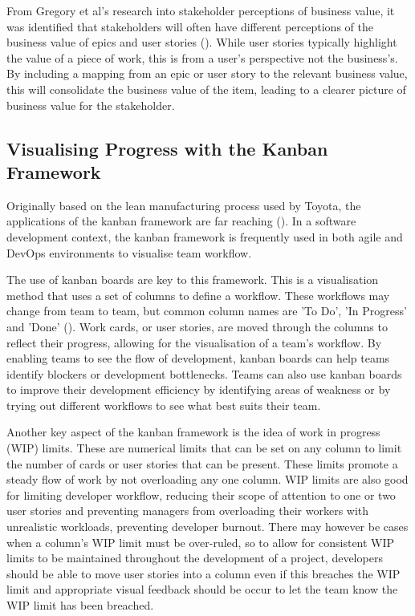\documentclass[l4proj.tex]{subfiles}
\begin{document}
From Gregory et al's research into stakeholder perceptions of business value, it was identified that stakeholders will often have different perceptions of the business value of epics and user stories (\cite{Gregory2020}). While user stories typically highlight the value of a piece of work, this is from a user's perspective not the business's. By including a mapping from an epic or user story to the relevant business value, this will consolidate the business value of the item, leading to a clearer picture of business value for the stakeholder.

\subsection{Visualising Progress with the Kanban Framework}
Originally based on the lean manufacturing process used by Toyota, the applications of the kanban framework are far reaching (\cite{Ahmad2018}). In a software development context, the kanban framework is frequently used in both agile and DevOps environments to visualise team workflow. 

The use of kanban boards are key to this framework. This is a visualisation method that uses a set of columns to define a workflow. These workflows may change from team to team, but common column names are 'To Do', 'In Progress' and 'Done' (\cite{RadiganKanban}). Work cards, or user stories, are moved through the columns to reflect their progress, allowing for the visualisation of a team's workflow. By enabling teams to see the flow of development, kanban boards can help teams identify blockers or development bottlenecks. Teams can also use kanban boards to improve their development efficiency by identifying areas of weakness or by trying out different workflows to see what best suits their team. 

Another key aspect of the kanban framework is the idea of work in progress (WIP) limits. These are numerical limits that can be set on any column to limit the number of cards or user stories that can be present. These limits promote a steady flow of work by not overloading any one column. WIP limits are also good for limiting developer workflow, reducing their scope of attention to one or two user stories and preventing managers from overloading their workers with unrealistic workloads, preventing developer burnout. There may however be cases when a column's WIP limit must be over-ruled, so to allow for consistent WIP limits to be maintained throughout the development of a project, developers should be able to move user stories into a column even if this breaches the WIP limit and appropriate visual feedback should be occur to let the team know the WIP limit has been breached.
\end{document}
